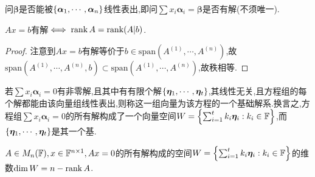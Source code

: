 \documentclass[openany]{book}
\begin{document}
\begin{example}
    问$\bm{\beta}$是否能被$\left\{\bm{\alpha}_1,\cdots,\bm{\alpha}_n\right\}$线性表出,即问$\sum x_i\bm{\alpha}_i=\bm{\beta}$是否有解(不须唯一).
\end{example}
\begin{theorem}
    $Ax=b$有解$\iff \operatorname{rank} A=\operatorname{rank} (A|b)$.
\end{theorem}
\begin{proof}
    注意到$Ax=b$有解等价于$b\in\mathrm{span}(A^{(1)},\cdots,A^{(n)})$,故$\mathrm{span}(A^{(1)},\cdots,A^{(n)},b)\subset \mathrm{span}(A^{(1)},\cdots,A^{(n)})$,故秩相等.
\end{proof}

若$\sum x_i\bm{\alpha}_i=0$有非零解,且其中有有限个解$\left\{\bm{\eta}_1,\cdots,\bm{\eta}_t\right\}$,其线性无关,且方程组的每个解都能由该向量组线性表出,则称这一组向量为该方程的一个基础解系.换言之,方程组$\sum x_i\bm{\alpha}_i=0$的所有解构成了一个向量空间$W=\left\{\sum_{i=1}^t k_i\bm{\eta}_i:k_i\in\mathbb{F}\right\}$,而$\left\{\bm{\eta}_1,\cdots,\bm{\eta}_t\right\}$是其一个基.
\begin{theorem}
    $A\in M_n(\mathbb{F}),x\in \mathbb{F}^{n\times 1}, Ax=0$的所有解构成的空间$W=\left\{\sum_{i=1}^t k_i\bm{\eta}_i:k_i\in\mathbb{F}\right\}$的维数$\dim W=n-\operatorname{rank} A$.
\end{theorem}
\end{document}
